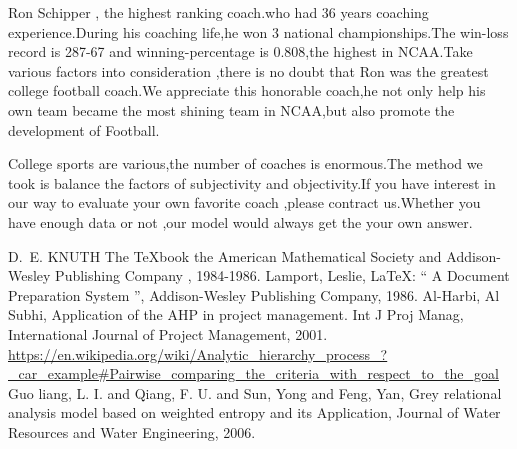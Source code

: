 \documentclass{mcmthesis}
\begin{document}
\par Ron Schipper , the highest ranking coach.who had 36 years coaching experience.During his coaching life,he won 3 national championships.The win-loss record is 287-67 and winning-percentage is 0.808,the highest in NCAA.Take various factors into consideration ,there is no doubt that Ron was the greatest college football coach.We appreciate this honorable coach,he not only help his own team became the most shining  team in NCAA,but also promote the development of Football.
\par College sports are various,the number of coaches is enormous.The method we took is balance the factors of subjectivity and objectivity.If you have interest in our way to evaluate your own favorite coach ,please contract us.Whether you have enough data or not ,our model would always get the your own answer.


\begin{thebibliography}{99}
 D.~E. KNUTH   The \TeX{}book  the American
Mathematical Society and Addison-Wesley
Publishing Company , 1984-1986.
Lamport, Leslie,  \LaTeX{}: `` A Document Preparation System '',
Addison-Wesley Publishing Company, 1986.
Al-Harbi, Al Subhi, Application of the AHP in project management. Int J Proj Manag,
International Journal of Project Management, 2001.
\url{https://en.wikipedia.org/wiki/Analytic_hierarchy_process_?_car_example#Pairwise_comparing_the_criteria_with_respect_to_the_goal}
Guo liang, L. I. and Qiang, F. U. and Sun, Yong and Feng, Yan, Grey relational analysis model based on weighted entropy and its Application,
Journal of Water Resources and Water Engineering, 2006.
\end{thebibliography}
\end{document}
